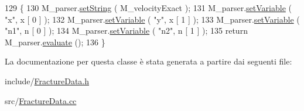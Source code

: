\begin{DoxyCode}
129 \{
130     M\_parser.\hyperlink{classLifeV_1_1Parser_ac05769e836a0dc95d9c020df361a5194}{setString} ( M\_velocityExact );
131     M\_parser.\hyperlink{classLifeV_1_1Parser_aa2b362e12b8feb60231705d499c9fbae}{setVariable} ( \textcolor{stringliteral}{"x"}, x [ 0 ] );
132     M\_parser.\hyperlink{classLifeV_1_1Parser_aa2b362e12b8feb60231705d499c9fbae}{setVariable} ( \textcolor{stringliteral}{"y"}, x [ 1 ] );
133     M\_parser.\hyperlink{classLifeV_1_1Parser_aa2b362e12b8feb60231705d499c9fbae}{setVariable} ( \textcolor{stringliteral}{"n1"}, n [ 0 ] );
134     M\_parser.\hyperlink{classLifeV_1_1Parser_aa2b362e12b8feb60231705d499c9fbae}{setVariable} ( \textcolor{stringliteral}{"n2"}, n [ 1 ] );
135     \textcolor{keywordflow}{return} M\_parser.\hyperlink{classLifeV_1_1Parser_a51d84fd4ae6d420620e7beee58fad673}{evaluate} ();
136 \}
\end{DoxyCode}


La documentazione per questa classe è stata generata a partire dai seguenti file\-:\begin{DoxyCompactItemize}
\item 
include/\hyperlink{FractureData_8h}{Fracture\-Data.\-h}\item 
src/\hyperlink{FractureData_8cc}{Fracture\-Data.\-cc}\end{DoxyCompactItemize}
